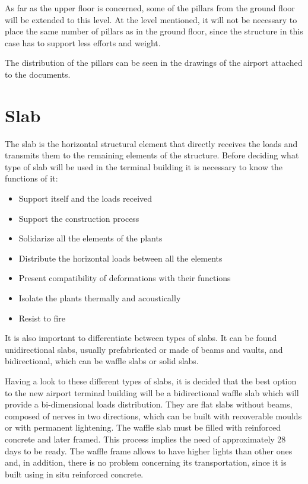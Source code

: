 As far as the upper floor is concerned, some of the pillars from the ground floor will be extended to this level. At the level mentioned, it will not be necessary to place the same number of pillars as in the ground floor, since the structure in this case has to support less efforts and weight.

The distribution of the pillars can be seen in the drawings of the airport attached to the documents.

	\section{Slab}
The slab is the horizontal structural element that directly receives the loads and transmits them to the remaining elements of the structure. Before deciding what type of slab will be used in the terminal building it is necessary to know the
functions of it:

\begin{itemize}
		\item Support itself and the loads received
		\item Support the construction process
		\item Solidarize all the elements of the plants
		\item Distribute the horizontal loads between all the elements
		\item Present compatibility of deformations with their functions
		\item Isolate the plants thermally and acoustically
		\item Resist to fire
\end{itemize}

It is also important to differentiate between types of slabs. It can be found unidirectional slabs, usually prefabricated or made of beams and vaults, and bidirectional, which can be waffle slabs or solid slabs.

Having a look to these different types of slabs, it is decided that the best option to the new airport terminal building will be a bidirectional waffle slab which will provide a bi-dimensional loads distribution. They are flat slabs without beams, composed of nerves in two directions, which can be built with recoverable moulds or with permanent lightening. The waffle slab must be filled with reinforced concrete and later framed. This process implies the need of approximately 28 days to be ready. The waffle frame allows to have higher lights than other ones and, in addition, there is no problem concerning its transportation, since it is built using in situ reinforced concrete.


	
